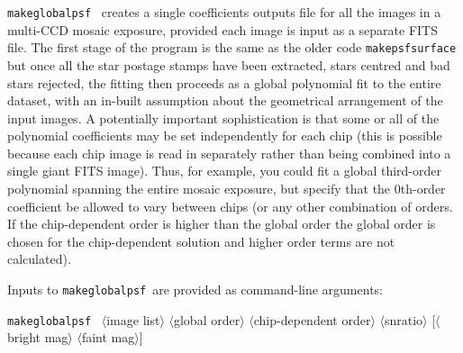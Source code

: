 \documentclass{article}
\def\makeglobalpsf{{\tt makeglobalpsf}\ }
\def\<{{$\langle$}}
\def\>{{$\rangle$}}
\begin{document}
\makeglobalpsf 
creates a single coefficients outputs file for all the images in a multi-CCD mosaic exposure, 
provided each image is input as a separate FITS file. The first stage of the program is the same as 
the older code {\tt makepsfsurface} but once all the star postage stamps have been extracted, stars centred and bad 
stars rejected, the fitting then proceeds as a global polynomial fit to the entire dataset, with an in-built 
assumption about the geometrical arrangement of the input images. A potentially important sophistication 
is that some or all of the polynomial coefficients may be set independently for each chip (this is possible 
because each chip image is read in separately rather than being combined into a single giant FITS image). 
Thus, for example, you could fit a global third-order polynomial spanning the entire mosaic exposure, but 
specify that the 0th-order coefficient be allowed to vary between chips (or any other combination of orders. 
If the chip-dependent order is higher than the global order the global order is chosen for the chip-dependent 
solution and higher order terms are not calculated). 

Inputs to \makeglobalpsf are provided as command-line arguments: 

\makeglobalpsf 
\<image list\> \<global order\> \<chip-dependent order\> \<snratio\> [\<bright mag\> \<faint mag\>] 
\end{document}
